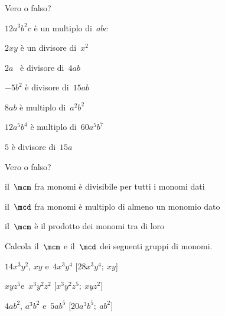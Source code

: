 \subsubsection*{}

\begin{esercizio}
 \label{ese:9.43}
Vero o falso?

\TabPositions{9cm}
\begin{enumeratea}
\item \(12a^{3}b^{2}c\) è un multiplo di~\(abc\) \tab\boxV\quad\boxF
\item \(2xy\) è un divisore di~\(x^{2}\) \tab\boxV\quad\boxF
\item \(2a\) \ è divisore di~\(4ab\) \tab\boxV\quad\boxF
\item \(-5b^{2}\) è divisore di~\(15ab\) \tab\boxV\quad\boxF
\item \(8ab\) è multiplo di~\(a^{2}b^{2}\) \tab\boxV\quad\boxF
\item \(12a^{5}b^{4}\) è multiplo di~\(60a^{5}b^{7}\) \tab\boxV\quad\boxF
\item \(5\) è divisore di~\(15a\) \tab\boxV\quad\boxF
\end{enumeratea}
\end{esercizio}

\begin{esercizio}
 \label{ese:9.44}
Vero o falso?

\TabPositions{10cm}
\begin{enumeratea}
\item il~\(\mcm\) fra monomi è divisibile per tutti i monomi dati 
\tab\boxV\quad\boxF
\item il~\(\mcd\) fra monomi è multiplo di almeno un monomio dato 
\tab\boxV\quad\boxF
\item il~\(\mcm\) è il prodotto dei monomi tra di loro \tab\boxV\quad\boxF
\end{enumeratea}
\end{esercizio}

\begin{esercizio}[\Ast]
 \label{ese:9.45}
Calcola il~\(\mcm\) e il~\(\mcd\) dei seguenti gruppi di monomi.

\begin{enumeratea}
 \item \(14x^{3}y^{2}\), \(xy\) e~\(4x^{3}y^{4}\) \hfill[\(28x^{3}y^{4};~xy\)]
 \item \(xyz^{5}\)e~\(x^{3}y^{2}z^{2}\) \hfill[\(x^{3}y^{2}z^{5};~xyz^{2}\)]
 \item \(4ab^{2}\), \(a^{3}b^{2}\) e~\(5ab^{5}\) \hfill[\(20a^{3}b^{5};~ab^{2}\)]
\end{enumeratea}
\end{esercizio}

